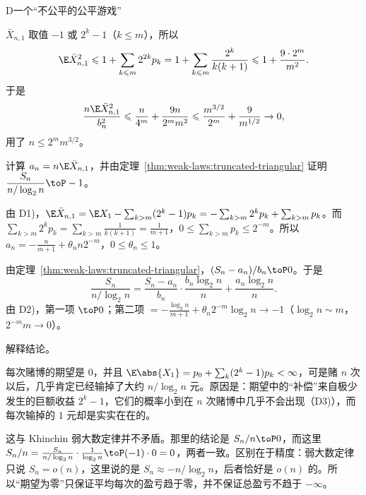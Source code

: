 \begin{probleme}[问题]{D}{一个“不公平的公平游戏”}
\begin{questions}
\begin{solution}
$\bar X_{n,1}$ 取值 $-1$ 或 $2^k-1$（$k\leqslant m$），所以
\[
\E\bar X_{n,1}^2\leqslant1+\sum_{k\leqslant m}2^{2k}p_k=1+\sum_{k\leqslant m}\frac{2^k}{k(k+1)}\leqslant1+\frac{9\cdot2^m}{m^2}.
\]
于是
\[
\frac{n\E\bar X_{n,1}^2}{b_n^2}\leqslant\frac n{4^m}+\frac{9n}{2^mm^2}\leqslant\frac{m^{3/2}}{2^m}+\frac9{m^{1/2}}\to0,
\]
用了 $n\leqslant2^mm^{3/2}$。
\end{solution}
\item 计算 $a_n=n\E\bar X_{n,1}$，并由定理~\ref{thm:weak-laws:truncated-triangular} 证明 $\dfrac{S_n}{n/\log_2n}\toP-1$。
\begin{solution}
由 D1)，$\E\bar X_{n,1}=\E X_1-\sum_{k>m}(2^k-1)p_k=-\sum_{k>m}2^kp_k+\sum_{k>m}p_k$。而 $\sum_{k>m}2^kp_k=\sum_{k>m}\frac1{k(k+1)}=\frac1{m+1}$，$0\leqslant\sum_{k>m}p_k\leqslant2^{-m}$。所以 $a_n=-\frac n{m+1}+\theta_nn2^{-m}$，$0\leqslant\theta_n\leqslant1$。

由定理~\ref{thm:weak-laws:truncated-triangular}，$(S_n-a_n)/b_n\toP0$。于是
\[
\frac{S_n}{n/\log_2n}=\frac{S_n-a_n}{b_n}\cdot\frac{b_n\log_2n}n+\frac{a_n\log_2n}n .
\]
由 D2)，第一项 $\toP0$；第二项 $=-\frac{\log_2n}{m+1}+\theta_n2^{-m}\log_2n\to-1$（$\log_2n\sim m$，$2^{-m}m\to0$）。
\end{solution}
\item 解释结论。
\begin{solution}
每次赌博的期望是 $0$，并且 $\E\abs{X_1}=p_0+\sum_k(2^k-1)p_k<\infty$，可是赌 $n$ 次以后，几乎肯定已经输掉了大约 $n/\log_2n$ 元。原因是：期望中的“补偿”来自极少发生的巨额收益 $2^k-1$，它们的概率小到在 $n$ 次赌博中几乎不会出现（D3)），而每次输掉的 $1$ 元却是实实在在的。

这与 Khinchin 弱大数定律并不矛盾。那里的结论是 $S_n/n\toP0$，而这里 $S_n/n=\frac{S_n}{n/\log_2n}\cdot\frac1{\log_2n}\toP(-1)\cdot0=0$，两者一致。区别在于精度：弱大数定律只说 $S_n=o(n)$，这里说的是 $S_n\approx-n/\log_2n$，后者恰好是 $o(n)$ 的。所以“期望为零”只保证平均每次的盈亏趋于零，并不保证总盈亏不趋于 $-\infty$。
\end{solution}
\end{questions}
\end{probleme}

